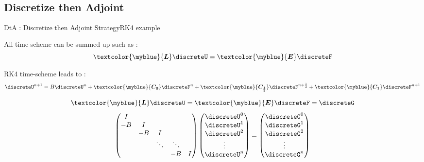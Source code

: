 \subsection{Discretize then Adjoint}
\begin{frame}{DtA : Discretize then Adjoint Strategy}{RK4 example}

  All time scheme can be summed-up such as :
  \begin{equation}
    \textcolor{\myblue}{\boldsymbol{L}}\discreteU=\textcolor{\myblue}{\boldsymbol{E}}\discreteF
  \end{equation}

  \small
      RK4 time-scheme leads to :
    \begin{equation}
      \discreteU^{n+1}=B\discreteU^n+\textcolor{\myblue}{\boldsymbol{C_0}}\discreteF^n+\textcolor{\myblue}{\boldsymbol{C_{\frac{1}{2}}}}\discreteF^{n+\frac{1}{2}}+\textcolor{\myblue}{\boldsymbol{C_1}}\discreteF^{n+1}
    \end{equation}

\begin{equation}
  \textcolor{\myblue}{\boldsymbol{L}}\discreteU=\textcolor{\myblue}{\boldsymbol{E}}\discreteF=\discreteG
\end{equation}
\begin{equation}
  \begin{pmatrix}
    I & & & & \\
    -B&I & & & \\
    & -B&I  & & \\
    & & \ddots & \ddots   & \\
    & &  & -B &I \\
  \end{pmatrix}
    \begin{pmatrix}
    \discreteU^0 \\
    \discreteU^1 \\
    \discreteU^2 \\
    \vdots \\
    \discreteU^n \\
  \end{pmatrix}=
  \begin{pmatrix}
    \discreteG^0 \\
    \discreteG^1 \\
    \discreteG^2 \\
    \vdots \\
    \discreteG^n \\
  \end{pmatrix}
  \end{equation}
\end{frame}


